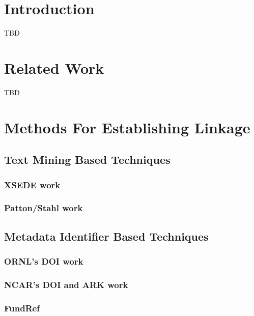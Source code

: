 \documentclass{sig-alternate}
\begin{document}
\section{Introduction}

TBD

\section{Related Work}

TBD

\section{Methods For Establishing Linkage}

\subsection{Text Mining Based Techniques}

\subsubsection{XSEDE work}
\subsubsection{Patton/Stahl work}

\subsection{Metadata Identifier Based Techniques}

\subsubsection{ORNL's DOI work}

\subsubsection{NCAR's DOI and ARK work}

\subsubsection{FundRef}
\end{document}

